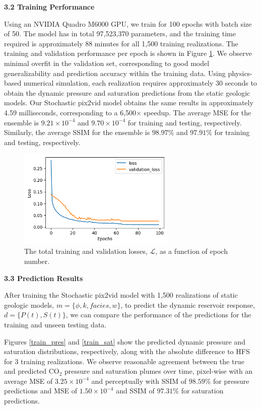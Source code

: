 \documentclass[10pt, twoside]{article}
\begin{document}
\textbf{3.2 Training Performance}

Using an NVIDIA Quadro M6000 GPU, we train for 100 epochs with batch size of 50. The model has in total 97,523,370 parameters, and the training time required is approximately 88 minutes for all 1,500 training realizations. The training and validation performance per epoch is shown in Figure \ref{train_perf}. We observe minimal overfit in the validation set, corresponding to good model generalizability and prediction accuracy within the training data. Using physics-based numerical simulation, each realization requires approximately 30 seconds to obtain the dynamic pressure and saturation predictions from the static geologic models. Our Stochastic pix2vid model obtains the same results in approximately 4.59 milliseconds, corresponding to a 6,500× speedup. The average MSE for the ensemble is $9.21\times10^{-4}$ and $9.70\times10^{-4}$ for training and testing, respectively. Similarly, the average SSIM for the ensemble is $98.97\%$ and $97.91\%$ for training and testing, respectively.

\begin{figure}[h]
    \centering
    \includegraphics[width=7.5cm]{figures/train_performance.png}
    \caption{The total training and validation losses, $\mathcal{L}$, as a function of epoch number.}
    \label{train_perf}
\end{figure}

\textbf{3.3 Prediction Results}

After training the Stochastic pix2vid model with 1,500 realizations of static geologic models, $m=\{\phi,k,facies,w\}$, to predict the dynamic reservoir response, $d=\{P(t),S(t)\}$, we can compare the performance of the predictions for the training and unseen testing data. 

Figures \ref{train_pres} and \ref{train_sat} show the predicted dynamic pressure and saturation distributions, respectively, along with the absolute difference to HFS for 3 training realizations. We observe reasonable agreement between the true and predicted CO$_2$ pressure and saturation plumes over time, pixel-wise with an average MSE of $3.25\times10^{-4}$ and perceptually with SSIM of $98.59\%$ for pressure predictions and MSE of $1.50\times10^{-4}$ and SSIM of $97.31\%$ for saturation predictions.
\end{document}
